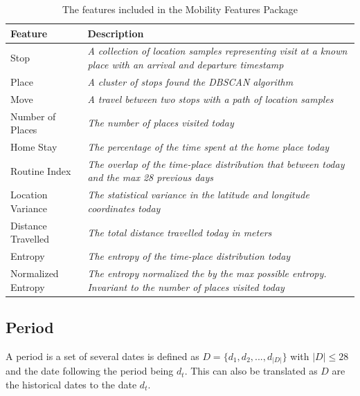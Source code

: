 \begin{table}[h]
    \centering
    \begin{tabular}{|p{}|p{}|}
\hline
\textbf{Feature}   & \textbf{Description}                                                                                                  \\ \hline
Stop               & \textit{A collection of location samples representing visit at a known place with an arrival and departure timestamp} \\ \hline
Place              & \textit{A cluster of stops found the DBSCAN algorithm}                                                                \\ \hline
Move               & \textit{A travel between two stops with a path of location samples}                                                   \\ \hline
Number of Places   & \textit{The number of places visited today}                                                                           \\ \hline
Home Stay          & \textit{The percentage of the time spent at the home place today}                                                     \\ \hline
Routine Index      & \textit{The overlap of the time-place distribution that between today and the max 28 previous days}                   \\ \hline
Location Variance  & \textit{The statistical variance in the latitude and longitude coordinates today}                                     \\ \hline
Distance Travelled & \textit{The total distance travelled today in meters}                                                                 \\ \hline
Entropy            & \textit{The entropy of the time-place distribution today}                                                             \\ \hline
Normalized Entropy & \textit{The entropy normalized the by the max possible entropy. Invariant to the number of places visited today}      \\ \hline
\end{tabular}
    \caption{The features included in the Mobility Features Package}
    \label{tab:features-nilsson}
\end{table}

\subsection{Period}
A period is a set of several dates is defined as $D = \{d_1, d_2, ..., d_{|D|}\}$ with $|D| \leq 28$ and the date following the period being $d_t$. This can also be translated as $D$ are the historical dates to the date $d_t$.\\

